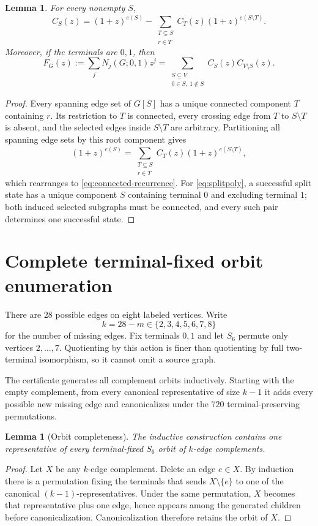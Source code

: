 \documentclass[11pt]{article}
\newtheorem{lemma}[theorem]{Lemma}
\begin{document}
\begin{lemma}\label{lem:connected-recurrence}
For every nonempty $S$,
\begin{equation}\label{eq:connected-recurrence}
 C_S(z)=(1+z)^{e(S)}-
 \sum_{\substack{T\subsetneq S\\r\in T}}
 C_T(z)(1+z)^{e(S\setminus T)}.
\end{equation}
Moreover, if the terminals are $0,1$, then
\begin{equation}\label{eq:splitpoly}
 F_G(z):=\sum_j N_j(G;0,1)z^j
 =\sum_{\substack{S\subseteq V\\0\in S,\ 1\notin S}} C_S(z)C_{V\setminus S}(z).
\end{equation}
\end{lemma}
\begin{proof}
Every spanning edge set of $G[S]$ has a unique connected component $T$ containing $r$. Its restriction to $T$ is connected, every crossing edge from $T$ to $S\setminus T$ is absent, and the selected edges inside $S\setminus T$ are arbitrary. Partitioning all spanning edge sets by this root component gives
\[
 (1+z)^{e(S)}=
 \sum_{\substack{T\subseteq S\\r\in T}}C_T(z)(1+z)^{e(S\setminus T)},
\]
which rearranges to \eqref{eq:connected-recurrence}. For \eqref{eq:splitpoly}, a successful split state has a unique component $S$ containing terminal $0$ and excluding terminal $1$; both induced selected subgraphs must be connected, and every such pair determines one successful state.
\end{proof}

\section{Complete terminal-fixed orbit enumeration}
There are $28$ possible edges on eight labeled vertices. Write
\[
 k=28-m\in\{2,3,4,5,6,7,8\}
\]
for the number of missing edges. Fix terminals $0,1$ and let $S_6$ permute only vertices $2,\ldots,7$. Quotienting by this action is finer than quotienting by full two-terminal isomorphism, so it cannot omit a source graph.

The certificate generates all complement orbits inductively. Starting with the empty complement, from every canonical representative of size $k-1$ it adds every possible new missing edge and canonicalizes under the $720$ terminal-preserving permutations.

\begin{lemma}[Orbit completeness]\label{lem:orbit}
The inductive construction contains one representative of every terminal-fixed $S_6$ orbit of $k$-edge complements.
\end{lemma}
\begin{proof}
Let $X$ be any $k$-edge complement. Delete an edge $e\in X$. By induction there is a permutation fixing the terminals that sends $X\setminus\{e\}$ to one of the canonical $(k-1)$-representatives. Under the same permutation, $X$ becomes that representative plus one edge, hence appears among the generated children before canonicalization. Canonicalization therefore retains the orbit of $X$.
\end{proof}
\end{document}
